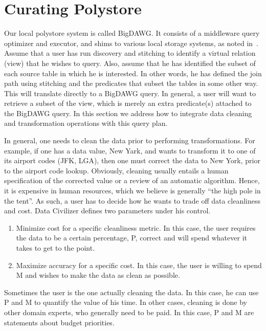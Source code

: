 \section{Curating Polystore}
\label{sec:curating}

Our local polystore system is called BigDAWG.  It consists of a middleware query
optimizer and executor, and shims to various local storage systems, as noted in~\cite{DBLP:journals/sigmod/DugganESBHKMMMZ15, DBLP:journals/pvldb/ElmoreDSBCGHHKK15}.  Assume that a user has run discovery and stitching to identify
a virtual relation (view) that he wishes to query.  Also, assume that he has
identified the subset of each source table in which he is interested.  In other
words, he has defined the join path using stitching and the predicates that
subset the tables in some other way.  This will translate directly to a BigDAWG
query.  In general, a user will want to retrieve a subset of the view, which is
merely an extra predicate(s) attached to the BigDAWG query.   In this section we
address how to integrate data cleaning and transformation operations with this
query plan.

In general, one needs to clean the data prior to performing transformations.
For example, if one has a data value, New Yark, and wants to transform it to one
of its airport codes (JFK, LGA), then one must correct the data to New York,
prior to the airport code lookup.  Obviously, cleaning usually entails a human
specification of the corrected value or a review of an automatic algorithm.
Hence, it is expensive in human resources, which we believe is generally ``the
high pole in the tent''.  As such, a user has to decide how he wants to trade off
data cleanliness and cost.  Data Civilizer defines two parameters under his
control.

\begin{enumerate}
\item Minimize cost for a specific cleanliness metric.  In this case, the
user requires the data to be a certain percentage, P, correct and will spend
whatever it takes to get to the point.
\item Maximize accuracy for a specific cost.  In this case, the user is
willing to spend M and wishes to make the data as clean as possible.
\end{enumerate}

Sometimes the user is the one actually cleaning the data.  In this case, he can
use P and M to quantify the value of his time.  In other cases, cleaning is done
by other domain experts, who generally need to be paid.  In this case, P and M
are statements about budget priorities.


